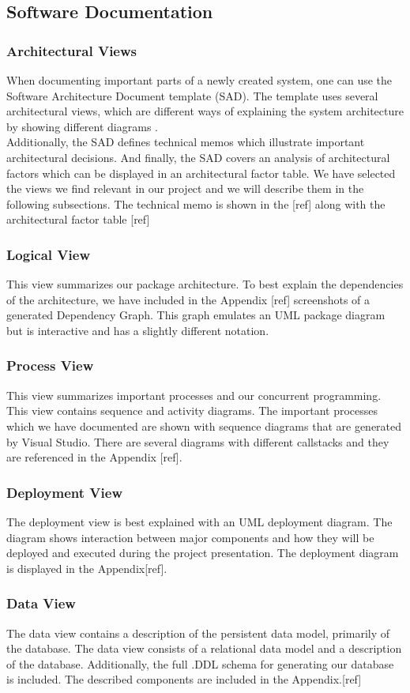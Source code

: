 \subsection{Software Documentation}
\subsubsection{Architectural Views}
When documenting important parts of a newly created system, one can use the Software Architecture Document template (SAD). The template uses several architectural views, which are different ways of explaining the system architecture by showing different diagrams \cite[p.~656]{OOAD}.\\
Additionally, the SAD defines technical memos which illustrate important architectural decisions. And finally, the SAD covers an analysis
of architectural factors which can be displayed in an architectural factor table. 
We have selected the views we find relevant in our project and we will describe them in the following subsections.
The technical memo is shown in the [ref] along with the architectural factor table [ref]

\subsubsection{Logical View} 
This view summarizes our package architecture. To best explain the dependencies of the architecture, we have included in the Appendix [ref]
screenshots of a generated Dependency Graph. This graph emulates an UML package diagram but is interactive and has a slightly different notation.
\subsubsection{Process View}
This view summarizes important processes and our concurrent programming. This view contains sequence and activity diagrams.
The important processes which we have documented are shown with sequence diagrams that are generated by Visual Studio. There are several diagrams
with different callstacks and they are referenced in the Appendix [ref]. 
\subsubsection{Deployment View}
The deployment view is best explained with an UML deployment diagram. The diagram shows interaction between major components and how they
will be deployed and executed during the project presentation. The deployment diagram is displayed in the Appendix[ref].
\subsubsection{Data View}
The data view contains a description of the persistent data model, primarily of the database. The data view consists of a relational data model
and a description of the database. Additionally, the full .DDL schema for generating our database is included. The described components are included in the Appendix.[ref]


